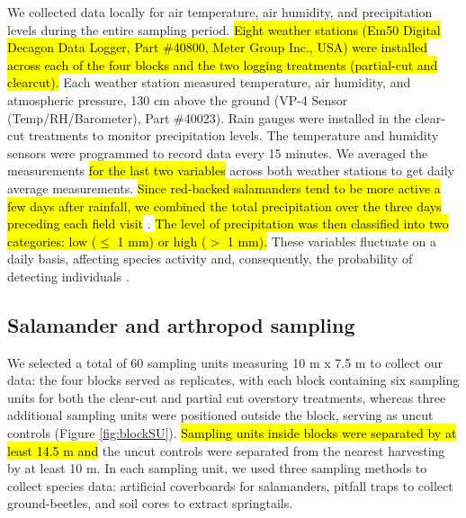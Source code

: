 We collected data locally for air temperature, air humidity, and precipitation levels during the entire sampling period. 
\hl{Eight weather stations (Em50 Digital Decagon Data Logger, Part \#40800, Meter Group Inc., USA) were installed across each of the four blocks and the two logging treatments (partial-cut and clearcut). }
Each weather station measured temperature, air humidity, and atmospheric pressure, 130 cm above the ground (VP-4 Sensor (Temp/RH/Barometer), Part \#40023). 
Rain gauges were installed in the clear-cut treatments to monitor precipitation levels. 
The temperature and humidity sensors were programmed to record data every 15 minutes. 
We averaged the measurements \hl{for the last two variables} across both weather stations to get daily average measurements. 
\hl{Since red-backed salamanders tend to be more active a few days after rainfall, we combined the total precipitation over the three days preceding each field visit} \citep{odonnellPredictingVariationMicrohabitat2014a}. 
\hl{The level of precipitation was then classified into two categories: low ($\leq$ 1 mm) or high ($>$ 1 mm). }
These variables fluctuate on a daily basis, affecting species activity and, consequently, the probability of detecting individuals \citep{spotilaRoleTemperatureWater1972,butterfieldCarabidLifeCycle1996,loveiEcologyBehaviorGround1996,odonnellPredictingVariationMicrohabitat2014a}.

\vspace{0.5cm}

\subsection*{Salamander and arthropod sampling}
\label{subsec:sampling}

We selected a total of 60 sampling units measuring 10 m x 7.5 m to collect our data: the four blocks served as replicates, 
with each block containing six sampling units for both the clear-cut and partial cut overstory treatments, 
whereas three additional sampling units were positioned outside the block, serving as uncut controls (Figure \ref*{fig:blockSU}). 
\hl{Sampling units inside blocks were separated by at least 14.5 m and} the uncut controls were separated from the nearest harvesting by at least 10 m.
In each sampling unit, we used three sampling methods to collect species data: artificial coverboards for salamanders, pitfall traps to collect ground-beetles, and soil cores to extract springtails. 

